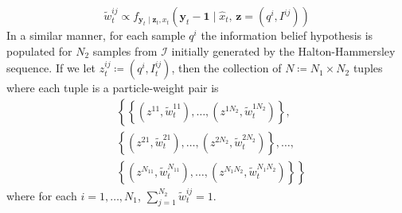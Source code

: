 \documentclass[letterpaper, 10 pt, conference]{ieeeconf}
\begin{document}
\begin{equation}
\widetilde{w}_t^{ij} \propto f_{\bm{y}_t \mid \bm{z}_t,x_t}(\bm{y}_t - \bm{1} \mid \hat{x}_t,\, \bm{z}=(q^i,I^{ij}))
\end{equation}
In a similar manner, for each sample $q^{i}$
the information belief hypothesis is populated for $N_2$ samples from $\mathcal{I}$ initially generated by the Halton-Hammersley sequence. If we let $z_t^{ij} \coloneqq (q^{i},I_t^{ij})$, then the collection of $N\coloneqq N_1\times N_2$ tuples where each tuple is a particle-weight pair is
\begin{align*}
&\left\{
\left\{
\left(
z^{11},\widetilde{w}_{t}^{11}\right),\dots,\left(
z^{1N_2},\widetilde{w}_{t}^{1N_2}\right) \right\}\right.,  \\
&\left\{\left(
z^{21},\widetilde{w}_{t}^{21}\right),\dots,\left(
z^{2N_2},\widetilde{w}_{t}^{2N_2}\right) \right\},\dots, \\
&\left. \left\{
\left(
z^{N_11},\widetilde{w}_{t}^{N_11}\right),\dots,\left(
z^{N_1N_2},\widetilde{w}_{t}^{N_1N_2}\right) \right\} \right\}
\end{align*}
where for each $i = 1,\dots,N_1$, $\sum_{j=1}^{N_2} \widetilde{w}_{t}^{ij} = 1$.

\end{document}
